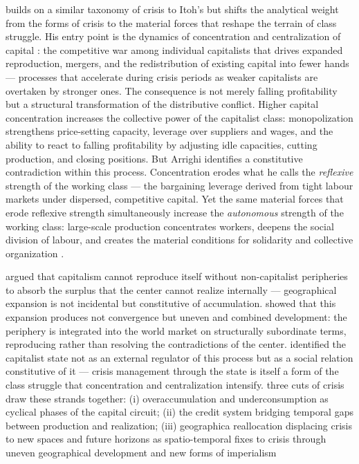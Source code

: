 \documentclass[11pt,a4paper]{article}
\begin{document}
\citet{Arrighi1978} builds on a similar taxonomy of crisis to Itoh's but 
shifts the analytical weight from the forms of crisis to the material 
forces that reshape the terrain of class struggle. His entry point is 
the dynamics of concentration and centralization of capital 
\citep{MarxKVI}: the competitive war among individual capitalists that 
drives expanded reproduction, mergers, and the redistribution of existing 
capital into fewer hands --- processes that accelerate during crisis 
periods as weaker capitalists are overtaken by stronger ones. The 
consequence is not merely falling profitability but a structural 
transformation of the distributive conflict. Higher capital concentration 
increases the collective power of the capitalist class: monopolization 
strengthens price-setting capacity, leverage over suppliers and wages, 
and the ability to react to falling profitability by adjusting idle 
capacities, cutting production, and closing positions. But Arrighi 
identifies a constitutive contradiction within this process. 
Concentration erodes what he calls the \textit{reflexive} strength of 
the working class --- the bargaining leverage derived from tight labour 
markets under dispersed, competitive capital. Yet the same material 
forces that erode reflexive strength simultaneously increase the 
\textit{autonomous} strength of the working class: large-scale production 
concentrates workers, deepens the social division of labour, and creates 
the material conditions for solidarity and collective organization 
\citep[p.~7]{Arrighi1978}.

\citet{Luxemburg2015} argued that capitalism cannot 
reproduce itself without non-capitalist peripheries to absorb the 
surplus that the center cannot realize internally --- geographical 
expansion is not incidental but constitutive of accumulation. 
\citet{Trotsky2017} showed that this expansion produces not convergence 
but uneven and combined development: the periphery is integrated into the world market on structurally subordinate terms, reproducing rather than resolving the contradictions of the center. \citet{Poulantzas2000} identified the capitalist state not as an external regulator of this process but as a social relation constitutive of it --- crisis management through the state is itself a form of the class struggle that  concentration and centralization intensify.\citet{Harvey2018} three cuts of crisis draw these strands together: (i) overaccumulation and underconsumption as cyclical phases of the capital circuit; (ii) the credit system bridging temporal gaps between production and realization; (iii) geographica reallocation displacing crisis to new spaces and future horizons as spatio-temporal fixes to crisis through uneven geographical development and new forms of imperialism \citep{Harvey2001}
\end{document}
